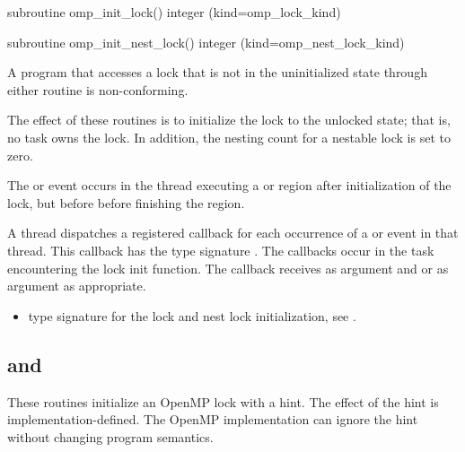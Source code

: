 \fortranspecificstart
\begin{boxedcode}
subroutine omp\_init\_lock()
integer (kind=omp\_lock\_kind) 

subroutine omp\_init\_nest\_lock()
integer (kind=omp\_nest\_lock\_kind) 
\end{boxedcode}
\fortranspecificend

\constraints
A program that accesses a lock that is not in the uninitialized state through either routine 
is non-conforming.

\effect
The effect of these routines is to initialize the lock to the unlocked state; that is, no task 
owns the lock. In addition, the nesting count for a nestable lock is set to zero.

\events

The  or  event occurs in the thread 
executing a  or  region
after initialization of the lock, but before before finishing the region.

\tools

A thread dispatches a registered 
callback for each occurrence of a  or  event 
in that thread.  This callback has the type signature .
The callbacks occur in the task encountering
the lock init function.  The callback receives   as
 argument and
 or 
  as  argument as appropriate.

\crossreferences
\begin{itemize}
\item {} type signature for the lock
  and nest lock initialization, see .
\end{itemize}











\subsection[\code{omp\_init\_lock\_with\_hint} and \\\code{omp\_init\_nest\_lock\_with\_hint}]{ and \\}
\label{subsec:omp_init_lock_with_hint and omp_init_nest_lock_with_hint}
\summary
These routines initialize an OpenMP lock with a hint.  
The effect of the hint is implementation-defined. The OpenMP implementation
can ignore the hint without changing program semantics.


